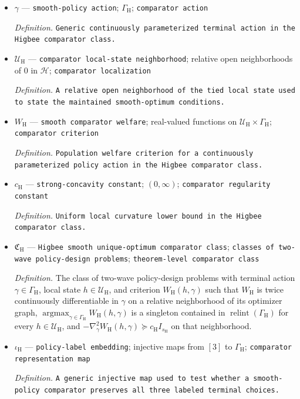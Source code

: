 \documentclass{article}
\begin{document}
\begin{itemize}
  \par\smallskip\noindent\emph{Definition.} \texttt{Continuously parameterized terminal-\allowbreak{}action set in the Higbee comparator class.}
  \item \(\gamma\) --- \texttt{smooth-\allowbreak{}policy action}; \(\Gamma_{\mathrm H}\); \texttt{comparator action}
  \par\smallskip\noindent\emph{Definition.} \texttt{Generic continuously parameterized terminal action in the Higbee comparator class.}
  \item \(\mathcal U_{\mathrm H}\) --- \texttt{comparator local-\allowbreak{}state neighborhood}; relative open neighborhoods of \(0\) in \(\mathcal H\); \texttt{comparator localization}
  \par\smallskip\noindent\emph{Definition.} \texttt{A relative open neighborhood of the tied local state used to state the maintained smooth-\allowbreak{}optimum conditions.}
  \item \(W_{\mathrm H}\) --- \texttt{smooth comparator welfare}; real-valued functions on \(\mathcal U_{\mathrm H}\times\Gamma_{\mathrm H}\); \texttt{comparator criterion}
  \par\smallskip\noindent\emph{Definition.} \texttt{Population welfare criterion for a continuously parameterized policy action in the Higbee comparator class.}
  \item \(c_{\mathrm H}\) --- \texttt{strong-\allowbreak{}concavity constant}; \((0,\infty)\); \texttt{comparator regularity constant}
  \par\smallskip\noindent\emph{Definition.} \texttt{Uniform local curvature lower bound in the Higbee comparator class.}
  \item \(\mathfrak C_{\mathrm H}\) --- \texttt{Higbee smooth unique-\allowbreak{}optimum comparator class}; \texttt{classes of two-\allowbreak{}wave policy-\allowbreak{}design problems}; \texttt{theorem-\allowbreak{}level comparator class}
  \par\smallskip\noindent\emph{Definition.} The class of two-wave policy-design problems with terminal action \(\gamma\in\Gamma_{\mathrm H}\), local state \(h\in\mathcal U_{\mathrm H}\), and criterion \(W_{\mathrm H}(h,\gamma)\) such that \(W_{\mathrm H}\) is twice continuously differentiable in \(\gamma\) on a relative neighborhood of its optimizer graph, \(\operatorname*{argmax}_{\gamma\in\Gamma_{\mathrm H}}W_{\mathrm H}(h,\gamma)\) is a singleton contained in \(\operatorname{relint}(\Gamma_{\mathrm H})\) for every \(h\in\mathcal U_{\mathrm H}\), and \(-\nabla_{\gamma}^2W_{\mathrm H}(h,\gamma)\succeq c_{\mathrm H}I_{s_{\mathrm H}}\) on that neighborhood.
  \item \(\iota_{\mathrm H}\) --- \texttt{policy-\allowbreak{}label embedding}; injective maps from \([3]\) to \(\Gamma_{\mathrm H}\); \texttt{comparator representation map}
  \par\smallskip\noindent\emph{Definition.} \texttt{A generic injective map used to test whether a smooth-\allowbreak{}policy comparator preserves all three labeled terminal choices.}
\end{itemize}
\end{document}
